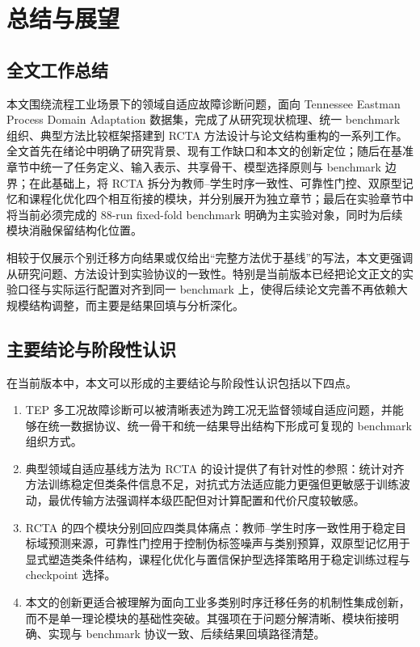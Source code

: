 \chapter{总结与展望}

\section{全文工作总结}
本文围绕流程工业场景下的领域自适应故障诊断问题，面向 Tennessee Eastman Process Domain Adaptation 数据集，完成了从研究现状梳理、统一 benchmark 组织、典型方法比较框架搭建到 RCTA 方法设计与论文结构重构的一系列工作。全文首先在绪论中明确了研究背景、现有工作缺口和本文的创新定位；随后在基准章节中统一了任务定义、输入表示、共享骨干、模型选择原则与 benchmark 边界；在此基础上，将 RCTA 拆分为教师--学生时序一致性、可靠性门控、双原型记忆和课程化优化四个相互衔接的模块，并分别展开为独立章节；最后在实验章节中将当前必须完成的 88-run fixed-fold benchmark 明确为主实验对象，同时为后续模块消融保留结构化位置。

相较于仅展示个别迁移方向结果或仅给出“完整方法优于基线”的写法，本文更强调从研究问题、方法设计到实验协议的一致性。特别是当前版本已经把论文正文的实验口径与实际运行配置对齐到同一 benchmark 上，使得后续论文完善不再依赖大规模结构调整，而主要是结果回填与分析深化。

\section{主要结论与阶段性认识}
在当前版本中，本文可以形成的主要结论与阶段性认识包括以下四点。

\begin{enumerate}
\item TEP 多工况故障诊断可以被清晰表述为跨工况无监督领域自适应问题，并能够在统一数据协议、统一骨干和统一结果导出结构下形成可复现的 benchmark 组织方式。
\item 典型领域自适应基线方法为 RCTA 的设计提供了有针对性的参照：统计对齐方法训练稳定但类条件信息不足，对抗式方法适应能力更强但更敏感于训练波动，最优传输方法强调样本级匹配但对计算配置和代价尺度较敏感。
\item RCTA 的四个模块分别回应四类具体痛点：教师--学生时序一致性用于稳定目标域预测来源，可靠性门控用于控制伪标签噪声与类别预算，双原型记忆用于显式塑造类条件结构，课程化优化与置信保护型选择策略用于稳定训练过程与 checkpoint 选择。
\item 本文的创新更适合被理解为面向工业多类别时序迁移任务的机制性集成创新，而不是单一理论模块的基础性突破。其强项在于问题分解清晰、模块衔接明确、实现与 benchmark 协议一致、后续结果回填路径清楚。
\end{enumerate}

